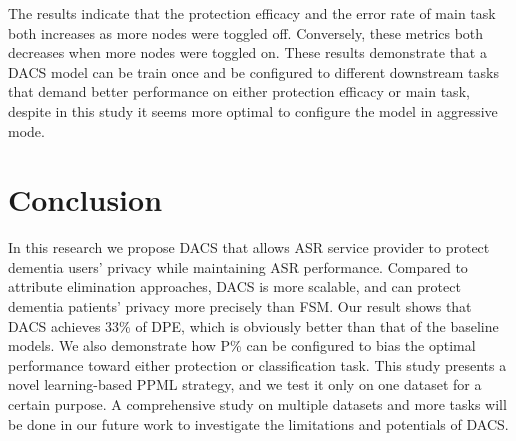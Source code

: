 \documentclass[lettersize,journal]{IEEEtran}
\begin{document}
The results indicate that the protection efficacy and the error rate of main task both increases as more nodes were toggled off. Conversely, these metrics both decreases when more nodes were toggled on. These results demonstrate that a DACS model can be train once and be configured to different downstream tasks that demand better performance on either protection efficacy or main task, despite in this study it seems more optimal to configure the model in aggressive mode.







\section{Conclusion}
\label{sec:conclusion}
In this research we propose DACS that allows ASR service provider to protect dementia users' privacy while maintaining ASR performance. Compared to attribute elimination approaches, DACS is more scalable, and can protect dementia patients' privacy more precisely than FSM. Our result shows that DACS achieves 33\% of DPE, which is obviously better than that of the baseline models. We also demonstrate how P\% can be configured to bias the optimal performance toward either protection or classification task. 
This study presents a novel learning-based PPML strategy, and we test it only on one dataset for a certain purpose. A comprehensive study on multiple datasets and more tasks will be done in our future work to investigate the limitations and potentials of DACS. 


% 

\end{document}
